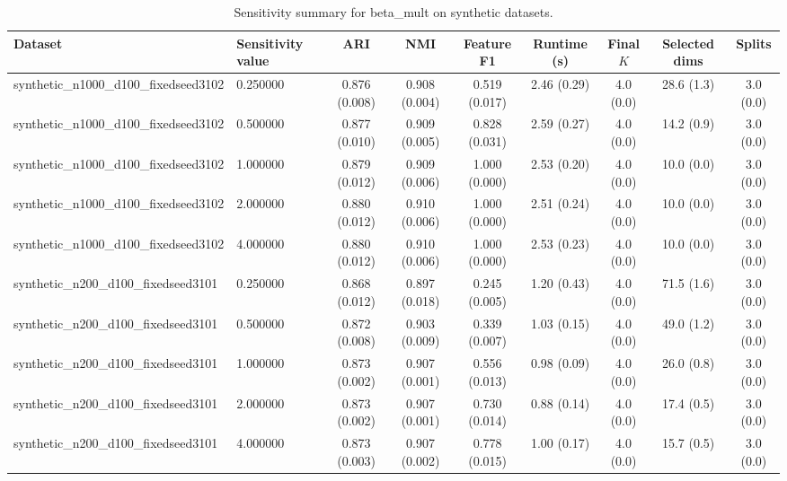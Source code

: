 \begin{table}[t]
\centering
\caption{Sensitivity summary for beta_mult on synthetic datasets.}
\label{tab:sens-beta_mult-synthetic}
\begin{tabular}{llccccccc}
\toprule
Dataset & Sensitivity value & ARI & NMI & Feature F1 & Runtime (s) & Final $K$ & Selected dims & Splits \\
\midrule
synthetic_n1000_d100_fixedseed3102 & 0.250000 & 0.876 (0.008) & 0.908 (0.004) & 0.519 (0.017) & 2.46 (0.29) & 4.0 (0.0) & 28.6 (1.3) & 3.0 (0.0) \\
synthetic_n1000_d100_fixedseed3102 & 0.500000 & 0.877 (0.010) & 0.909 (0.005) & 0.828 (0.031) & 2.59 (0.27) & 4.0 (0.0) & 14.2 (0.9) & 3.0 (0.0) \\
synthetic_n1000_d100_fixedseed3102 & 1.000000 & 0.879 (0.012) & 0.909 (0.006) & 1.000 (0.000) & 2.53 (0.20) & 4.0 (0.0) & 10.0 (0.0) & 3.0 (0.0) \\
synthetic_n1000_d100_fixedseed3102 & 2.000000 & 0.880 (0.012) & 0.910 (0.006) & 1.000 (0.000) & 2.51 (0.24) & 4.0 (0.0) & 10.0 (0.0) & 3.0 (0.0) \\
synthetic_n1000_d100_fixedseed3102 & 4.000000 & 0.880 (0.012) & 0.910 (0.006) & 1.000 (0.000) & 2.53 (0.23) & 4.0 (0.0) & 10.0 (0.0) & 3.0 (0.0) \\
synthetic_n200_d100_fixedseed3101 & 0.250000 & 0.868 (0.012) & 0.897 (0.018) & 0.245 (0.005) & 1.20 (0.43) & 4.0 (0.0) & 71.5 (1.6) & 3.0 (0.0) \\
synthetic_n200_d100_fixedseed3101 & 0.500000 & 0.872 (0.008) & 0.903 (0.009) & 0.339 (0.007) & 1.03 (0.15) & 4.0 (0.0) & 49.0 (1.2) & 3.0 (0.0) \\
synthetic_n200_d100_fixedseed3101 & 1.000000 & 0.873 (0.002) & 0.907 (0.001) & 0.556 (0.013) & 0.98 (0.09) & 4.0 (0.0) & 26.0 (0.8) & 3.0 (0.0) \\
synthetic_n200_d100_fixedseed3101 & 2.000000 & 0.873 (0.002) & 0.907 (0.001) & 0.730 (0.014) & 0.88 (0.14) & 4.0 (0.0) & 17.4 (0.5) & 3.0 (0.0) \\
synthetic_n200_d100_fixedseed3101 & 4.000000 & 0.873 (0.003) & 0.907 (0.002) & 0.778 (0.015) & 1.00 (0.17) & 4.0 (0.0) & 15.7 (0.5) & 3.0 (0.0) \\
\bottomrule
\end{tabular}
\end{table}
